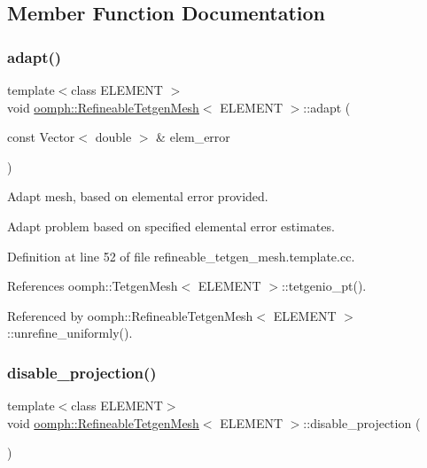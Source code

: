 \subsection{Member Function Documentation}
\mbox{\label{classoomph_1_1RefineableTetgenMesh_ad75ff5f1e088e611311c3f6a30feea5b}} 
\subsubsection{\texorpdfstring{adapt()}{adapt()}}
{\footnotesize\ttfamily template$<$class E\+L\+E\+M\+E\+NT $>$ \\
void \hyperlink{classoomph_1_1RefineableTetgenMesh}{oomph\+::\+Refineable\+Tetgen\+Mesh}$<$ E\+L\+E\+M\+E\+NT $>$\+::adapt (\begin{DoxyParamCaption}\item[{const Vector$<$ double $>$ \&}]{elem\+\_\+error }\end{DoxyParamCaption})}



Adapt mesh, based on elemental error provided. 

Adapt problem based on specified elemental error estimates. 

Definition at line 52 of file refineable\+\_\+tetgen\+\_\+mesh.\+template.\+cc.



References oomph\+::\+Tetgen\+Mesh$<$ E\+L\+E\+M\+E\+N\+T $>$\+::tetgenio\+\_\+pt().



Referenced by oomph\+::\+Refineable\+Tetgen\+Mesh$<$ E\+L\+E\+M\+E\+N\+T $>$\+::unrefine\+\_\+uniformly().

\mbox{\label{classoomph_1_1RefineableTetgenMesh_af5342732d4a4e715a443688a53801c00}} 
\subsubsection{\texorpdfstring{disable\+\_\+projection()}{disable\_projection()}}
{\footnotesize\ttfamily template$<$class E\+L\+E\+M\+E\+NT$>$ \\
void \hyperlink{classoomph_1_1RefineableTetgenMesh}{oomph\+::\+Refineable\+Tetgen\+Mesh}$<$ E\+L\+E\+M\+E\+NT $>$\+::disable\+\_\+projection (\begin{DoxyParamCaption}{ }\end{DoxyParamCaption})\hspace{0.3cm}{\ttfamily [inline]}}



